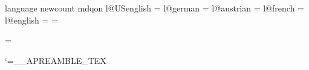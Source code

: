 \fi
\ifabfull

\gdef\abetc@german{

\def\abphrase##1{%
\ifcase##1{ \rm und }\or{}\or{ und andere}\or{ (Hrsg.)}\or{ (Hrsg.)}\or%
{ aus }\or{ in }\or{In }\or{Band}\or{Band}\or{Nummer}\or{Nummer}\or%
{ Auf{\kern0pt}lage}\or{Seiten}\or{Seite}\or{Kapitel}\or%
{Bericht}\or{Diplomarbeit}\or{Dissertation}\fi}

\def\abmonth##1{\ifcase##1\or Januar\or Februar\or M\"arz\or April\or Mai\or
  Juni\or Juli\or August\or September\or Oktober\or November\or Dezember\fi}

\def\abedition##1{\ifcase##1\or Erste\or Zweite\or Dritte\or Vierte\or F\"unf\-te\or
  Sechste\or Siebte\or Achte\or Neunte\or Zehnte\else?\fi}

\def\abchapter##1{\ifcase##1Abschnitt\or Absatz\or Anhang\or Teil\fi}

}

\else

\gdef\abetc@german{

\def\abphrase##1{%
\ifcase##1{ und }\or{}\or{ u.\thinspace a.}\or{ (Hrsg.)}\or{ (Hrsg.)}\or%
{ aus }\or{ in }\or{In }\or{Bd.}\or{Bd.}\or{Nr.}\or{Nr.}\or%
{ Aufl.}\or{S.}\or{S.}\or{Kap.}\or%
{Bericht}\or{Diplomarbeit}\or{Dissertation}\fi}

\def\abmonth##1{\ifcase##1\or Jan.\or Feb.\or M\"arz\or Apr.\or Mai\or
  Juni\or Juli\or Aug.\or Sep.\or Okt.\or Nov.\or Dez.\fi}

\def\abedition##1{\ifcase##1\or 1.\or 2.\or 3.\or 4.\or 5.\or
  6.\or 7.\or 8.\or 9.\or 10.\else?\fi}

\def\abchapter##1{\ifcase##1Abschn.\or Abs.\or Anh.\or Teil\fi}

}

\fi
\expandafter\ifx\csname language\endcsname\relax %
  \csname newcount\endcsname\language
\fi
\expandafter\ifx\csname mdqon\endcsname\relax %
  \chardef{}
  \chardef{}
  \chardef{}
  \chardef{}
  \chardef{}
  \language\USenglish
\else
  \expandafter\ifx\csname l@USenglish\endcsname\relax \else
    \chardef\USenglish=\l@USenglish\fi
  \expandafter\ifx\csname l@german\endcsname\relax \else
    \chardef\german=\l@german\fi
  \expandafter\ifx\csname l@austrian\endcsname\relax \else
    \chardef\austrian=\l@austrian\fi
  \expandafter\ifx\csname l@french\endcsname\relax \else
    \chardef\french=\l@french\fi
  \expandafter\ifx\csname l@english\endcsname\relax \else
    \chardef\english=\l@english\fi
\fi
\ifnum\language=\german
  \abtype@german \abetc@german
\else\ifnum\language=\austrian
  \abtype@german \abetc@german
\else
  \abtype@english \abetc@english
\fi\fi
\catcode`\@=\csname__APREAMBLE_TEX\endcsname
\endinput







